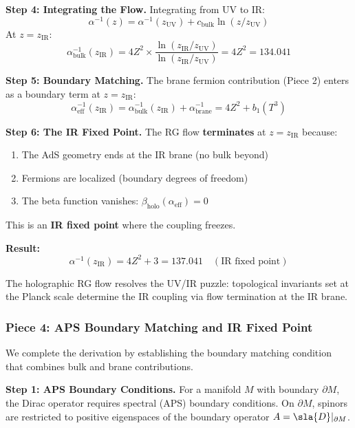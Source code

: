 \documentclass[12pt,a4paper]{article}
\newcommand{\Zsq}{Z^2}
\begin{document}
\textbf{Step 4: Integrating the Flow.}
Integrating from UV to IR:
\begin{equation}
\alpha^{-1}(z) = \alpha^{-1}(z_{\text{UV}}) + c_{\text{bulk}} \ln(z/z_{\text{UV}})
\end{equation}
At $z = z_{\text{IR}}$:
\begin{equation}
\alpha^{-1}_{\text{bulk}}(z_{\text{IR}}) = 4\Zsq \times \frac{\ln(z_{\text{IR}}/z_{\text{UV}})}{\ln(z_{\text{IR}}/z_{\text{UV}})} = 4\Zsq = 134.041
\end{equation}

\textbf{Step 5: Boundary Matching.}
The brane fermion contribution (Piece 2) enters as a boundary term at $z = z_{\text{IR}}$:
\begin{equation}
\alpha^{-1}_{\text{eff}}(z_{\text{IR}}) = \alpha^{-1}_{\text{bulk}}(z_{\text{IR}}) + \alpha^{-1}_{\text{brane}} = 4\Zsq + b_1(T^3)
\end{equation}

\textbf{Step 6: The IR Fixed Point.}
The RG flow \textbf{terminates} at $z = z_{\text{IR}}$ because:
\begin{enumerate}
    \item The AdS geometry ends at the IR brane (no bulk beyond)
    \item Fermions are localized (boundary degrees of freedom)
    \item The beta function vanishes: $\beta_{\text{holo}}(\alpha_{\text{eff}}) = 0$
\end{enumerate}
This is an \textbf{IR fixed point} where the coupling freezes.

\textbf{Result:}
\begin{equation}
\boxed{\alpha^{-1}(z_{\text{IR}}) = 4\Zsq + 3 = 137.041 \quad (\text{IR fixed point})}
\end{equation}

The holographic RG flow resolves the UV/IR puzzle: topological invariants set at the Planck scale determine the IR coupling via flow termination at the IR brane.

\subsubsection{Piece 4: APS Boundary Matching and IR Fixed Point}

We complete the derivation by establishing the boundary matching condition that combines bulk and brane contributions.

\textbf{Step 1: APS Boundary Conditions.}
For a manifold $M$ with boundary $\partial M$, the Dirac operator requires spectral (APS) boundary conditions. On $\partial M$, spinors are restricted to positive eigenspaces of the boundary operator $A = \sla{D}|_{\partial M}$.
\end{document}
